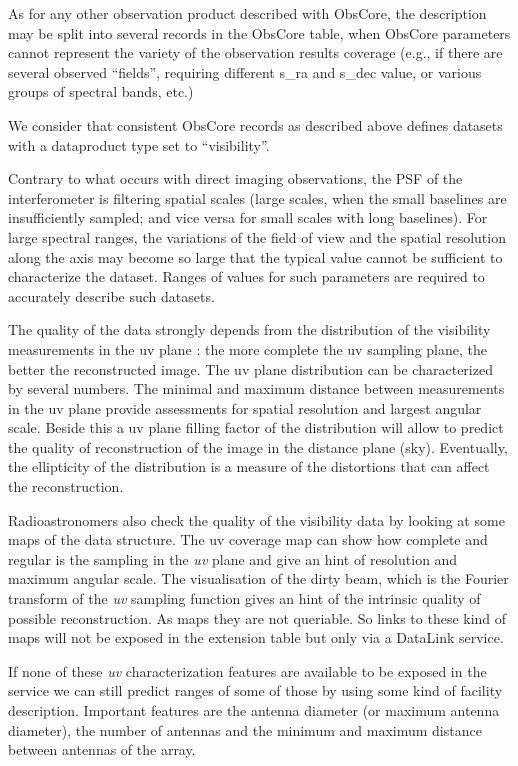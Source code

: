 \documentclass[11pt,a4paper]{ivoa}
\begin{document}
As for any other observation product described with ObsCore, the description may be split into
several records in the ObsCore table, when ObsCore parameters cannot represent the 
variety of the observation results coverage (e.g., if there are several observed ``fields'', 
requiring different s\_ra and s\_dec value, or various groups of spectral bands, etc.) 

We consider that consistent ObsCore records as described above defines datasets with 
a dataproduct type set to ``visibility''.


Contrary to what occurs with direct imaging observations, the PSF of the interferometer
is filtering spatial scales (large scales, when the small baselines are insufficiently 
sampled; and vice versa for small scales with long baselines).
For large spectral ranges, the variations of the field of view and the spatial resolution 
along the axis may become so large that the typical value cannot be sufficient to 
characterize the dataset. Ranges of values for such parameters are required to accurately 
describe such datasets.

The quality of the data strongly depends from the distribution of the visibility measurements 
in the uv plane : the more complete the uv sampling plane, the better the reconstructed image. 
The uv plane distribution can be characterized by several numbers. 
The minimal and maximum distance between measurements in the uv plane provide assessments for 
spatial resolution and largest angular scale. 
Beside this a uv plane filling factor of the distribution will allow to predict the quality 
of reconstruction of the image in the distance plane (sky).
Eventually, the ellipticity of the distribution is a measure of the distortions that can 
affect the reconstruction.

Radioastronomers also check the quality of the visibility data by looking at some maps of 
the data structure. The uv coverage map can show how complete and regular is the sampling in 
the \emph{uv} plane and give an hint of resolution and maximum angular scale. 
The visualisation of the dirty beam, which is the Fourier transform of the \emph{uv} sampling 
function gives an hint of the intrinsic quality of possible reconstruction. As maps they are 
not queriable. So links to these kind of maps will not be exposed in the extension 
table but only via a DataLink service. 

If none of these \emph{uv} characterization features are available to be exposed in the service 
we can still predict ranges of some of those by using some kind of facility description.  
Important features are the antenna diameter (or maximum antenna diameter), the number of 
antennas and the minimum and maximum distance between antennas of the array.
\end{document}
